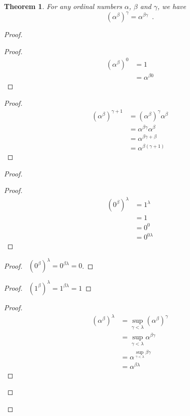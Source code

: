 \documentclass{book}
\let\qed\relax
\newtheorem{thm}[ax]{Theorem}
\theoremstyle{definition}
\begin{document}
\begin{thm}
For any ordinal numbers $\alpha$, $\beta$ and $\gamma$, we have
\[ (\alpha^\beta)^\gamma = \alpha^{\beta \gamma} \enspace . \]
\end{thm}

\begin{proof}
\pf
{}
\begin{proof}
	\pf
	\begin{align*}
		(\alpha^\beta)^0 & = 1 \\
		& = \alpha^{\beta 0}
	\end{align*}
\end{proof}
\begin{proof}
	\pf
	\begin{align*}
		(\alpha^\beta)^{\gamma + 1} & = (\alpha^\beta)^\gamma \alpha^\beta \\
		& = \alpha^{\beta \gamma} \alpha^\beta \\
		& = \alpha^{\beta \gamma + \beta} \\
		& = \alpha^{\beta (\gamma + 1)}
	\end{align*}
\end{proof}
\begin{proof}
	\begin{proof}
		\pf
		\begin{align*}
			(0^\beta)^\lambda & = 1^\lambda \\
			& = 1 \\
			& = 0^0 \\
			& = 0^{0 \lambda}
		\end{align*}
	\end{proof}
	\begin{proof}
		\pf\ $(0^\beta)^\lambda = 0^{\beta \lambda} = 0$.
	\end{proof}
	\begin{proof}
		\pf\ $(1^\beta)^\lambda = 1^{\beta \lambda} = 1$
	\end{proof}
	\begin{proof}
		\pf
		\begin{align*}
			(\alpha^\beta)^\lambda & = \sup_{\gamma < \lambda} (\alpha^\beta)^\gamma \\
			& = \sup_{\gamma < \lambda} \alpha^{\beta \gamma} \\
			& = \alpha^{\sup_{\gamma < \lambda} \beta \gamma} \\
			& = \alpha^{\beta \lambda}
		\end{align*}
	\end{proof}
\end{proof}
\qed
\end{proof}
\end{document}
